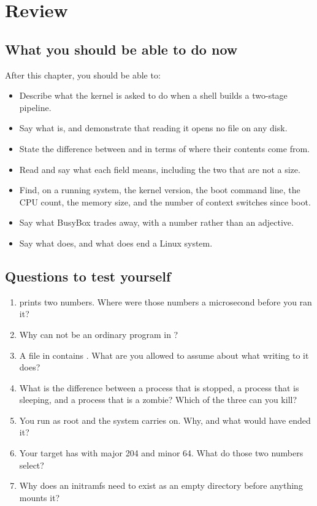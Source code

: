 
\section{Review}
\label{c2:sec:review}

\subsection*{What you should be able to do now}
After this chapter, you should be able to:
\begin{itemize}
  \item Describe what the kernel is asked to do when a shell builds a two-stage pipeline.
  \item Say what  is, and demonstrate that reading it opens no file on any disk.
  \item State the difference between  and  in terms of where their contents
    come from.
  \item Read  and say what each field means, including the two that are not a
    size.
  \item Find, on a running system, the kernel version, the boot command line, the CPU count, the
    memory size, and the number of context switches since boot.
  \item Say what BusyBox trades away, with a number rather than an adjective.
  \item Say what  does, and what does end a Linux system.
\end{itemize}

\subsection*{Questions to test yourself}
\begin{enumerate}
  \item {} prints two numbers. Where were those numbers a microsecond before
    you ran it?
  \item Why can  not be an ordinary program in ?
  \item A file in  contains . What are you allowed to assume about what writing
     to it does?
  \item What is the difference between a process that is stopped, a process that is sleeping, and a
    process that is a zombie? Which of the three can you kill?
  \item You run  as root and the system carries on. Why, and what would have ended
    it?
  \item Your target has  with major 204 and minor 64. What do those two numbers
    select?
  \item Why does an initramfs need  to exist as an empty directory before anything
    mounts it?
\end{enumerate}

